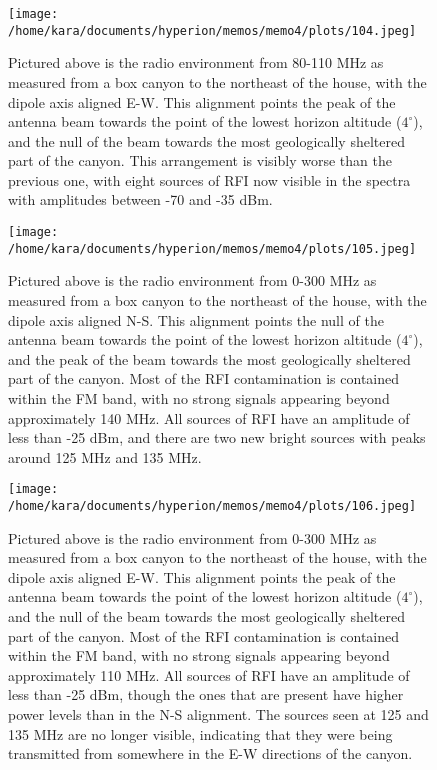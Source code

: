 \documentclass[11pt]{article}
\begin{document}
\begin{figure}[H]
 \begin{center}
 \texttt{[image: /home/kara/documents/hyperion/memos/memo4/plots/104.jpeg]}
 \end{center}
 \caption{
        Pictured above is the radio environment from 80-110 MHz as measured 
        from a box canyon to the northeast of the house, with the dipole axis 
        aligned E-W. This alignment points the peak of the antenna beam towards 
        the point of the lowest horizon altitude ($4^{\circ}$), and the null of 
        the beam towards the most geologically sheltered part of the canyon.  
        This arrangement is visibly worse than the previous one, with eight 
        sources of RFI now visible in the spectra with amplitudes between -70 
        and -35 dBm.
 }
 \label{fig:104}
\end{figure}

\begin{figure}[H]
 \begin{center}
 \texttt{[image: /home/kara/documents/hyperion/memos/memo4/plots/105.jpeg]}
 \end{center}
 \caption{
        Pictured above is the radio environment from 0-300 MHz as measured from 
        a box canyon to the northeast of the house, with the dipole axis 
        aligned N-S. This alignment points the null of the antenna beam towards 
        the point of the lowest horizon altitude ($4^{\circ}$), and the peak of 
        the beam towards the most geologically sheltered part of the canyon.  
        Most of the RFI contamination is contained within the FM band, with no 
        strong signals appearing beyond approximately 140 MHz. All sources of 
        RFI have an amplitude of less than -25 dBm, and there are two new 
        bright sources with peaks around 125 MHz and 135 MHz.
 }
 \label{fig:105}
\end{figure}


\begin{figure}[H]
 \begin{center}
 \texttt{[image: /home/kara/documents/hyperion/memos/memo4/plots/106.jpeg]}
 \end{center}
 \caption{
        Pictured above is the radio environment from 0-300 MHz as measured from 
        a box canyon to the northeast of the house, with the dipole axis 
        aligned E-W. This alignment points the peak of the antenna beam towards 
        the point of the lowest horizon altitude ($4^{\circ}$), and the null of 
        the beam towards the most geologically sheltered part of the canyon.  
        Most of the RFI contamination is contained within the FM band, with no 
        strong signals appearing beyond approximately 110 MHz. All sources of 
        RFI have an amplitude of less than -25 dBm, though the ones that are 
        present have higher power levels than in the N-S alignment. The sources 
        seen at 125 and 135 MHz are no longer visible, indicating that they 
        were being transmitted from somewhere in the E-W directions of the 
        canyon.
 }
 \label{fig:106}
\end{figure}
\end{document}
